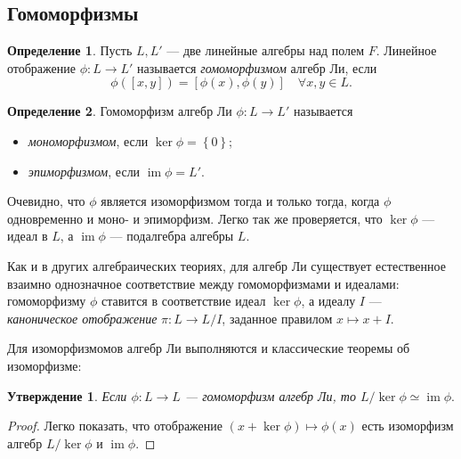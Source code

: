 \documentclass[a4paper, 12pt]{article}
\newtheorem{proposition}[theorem]{Утверждение}
\theoremstyle{definition}
\newtheorem{definition}{Определение}[section]
\begin{document}
\subsection{Гомоморфизмы}
\begin{definition}
    Пусть \({ L, L' }\) --- две линейные алгебры над полем \({ F }\). Линейное отображение \({ \phi : L \to L' }\) называется \textit{гомоморфизмом} алгебр Ли, если
    \[
        \phi([x, y]) = [\phi(x), \phi(y)] \quad \forall x, y \in L.
    \]
\end{definition}

\begin{definition}
    Гомоморфизм алгебр Ли \({ \phi : L \to L' }\) называется
    \begin{itemize}
        \item \textit{мономорфизмом}, если \({ \ker \phi = \left\{ 0 \right\} }\);
        \item \textit{эпиморфизмом}, если \({ \operatorname{im} \phi = L' }\).
    \end{itemize}
\end{definition}

Очевидно, что \({ \phi }\) является изоморфизмом тогда и только тогда, когда \({ \phi }\) одновременно и моно- и эпиморфизм. Легко так же проверяется, что \({ \ker \phi }\) --- идеал в \({ L }\), а \({ \operatorname{im} \phi }\) --- подалгебра алгебры \({ L }\).

Как и в других алгебраических теориях, для алгебр Ли существует естественное взаимно однозначное соответствие между гомоморфизмами и идеалами: гомоморфизму \({ \phi }\) ставится в соответствие идеал \({ \ker \phi }\), а идеалу \({ I }\) --- \textit{каноническое отображение} \({ \pi : L \to L / I }\), заданное правилом \({ x \mapsto x + I }\).

Для изоморфизмомов алгебр Ли выполняются и классические теоремы об изоморфизме:

\begin{proposition}
    \label{prop:1st_isomorphism_theorem}
    Если \({ \phi : L \to L }\) --- гомоморфизм алгебр Ли, то \( L / \ker \phi \simeq \operatorname{im} \phi. \)
\end{proposition}
\begin{proof}
    Легко показать, что отображение \({ (x + \ker \phi) \mapsto \phi(x) }\) есть изоморфизм алгебр \({ L / \ker \phi }\) и \({ \operatorname{im} \phi }\).
\end{proof}
\end{document}
